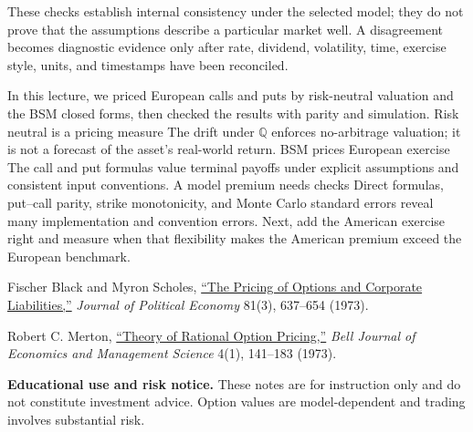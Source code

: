 \documentclass[11pt]{article}
\begin{document}
These checks establish internal consistency under the selected model; they do not prove that the assumptions describe a particular market well. A disagreement becomes diagnostic evidence only after rate, dividend, volatility, time, exercise style, units, and timestamps have been reconciled.

\keytakeaways
  {In this lecture, we priced European calls and puts by risk-neutral valuation and the BSM closed forms, then checked the results with parity and simulation.}
  {Risk neutral is a pricing measure}
  {The drift under $\mathbb Q$ enforces no-arbitrage valuation; it is not a forecast of the asset's real-world return.}
  {BSM prices European exercise}
  {The call and put formulas value terminal payoffs under explicit assumptions and consistent input conventions.}
  {A model premium needs checks}
  {Direct formulas, put--call parity, strike monotonicity, and Monte Carlo standard errors reveal many implementation and convention errors.}
  {Next, add the American exercise right and measure when that flexibility makes the American premium exceed the European benchmark.}

\begin{readinglist}
  \item Fischer Black and Myron Scholes, \href{https://doi.org/10.1086/260062}{``The Pricing of Options and Corporate Liabilities,''} \emph{Journal of Political Economy} 81(3), 637--654 (1973).
  \item Robert C. Merton, \href{https://doi.org/10.2307/1831029}{``Theory of Rational Option Pricing,''} \emph{Bell Journal of Economics and Management Science} 4(1), 141--183 (1973).
\end{readinglist}

\vfill
{\sffamily\footnotesize\color{vnmuted}\textbf{Educational use and risk notice.} These notes are for instruction only and do not constitute investment advice. Option values are model-dependent and trading involves substantial risk.}
\end{document}
